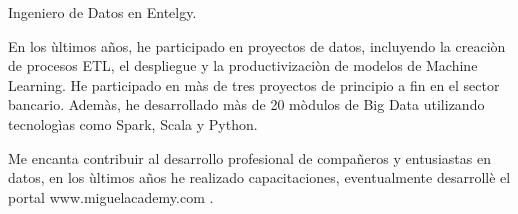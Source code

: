 

\begin{cvparagraph}


Ingeniero de Datos en Entelgy.

En los \`{u}ltimos años, he participado en proyectos de datos, incluyendo la creaci\`{o}n de procesos ETL, el despliegue y la productivizaci\`{o}n de modelos de Machine Learning.
He participado en m\`{a}s de tres proyectos de principio a fin en el sector bancario.
Adem\`{a}s, he desarrollado m\`{a}s de 20 m\`{o}dulos de Big Data utilizando tecnolog\`{i}as como Spark, Scala y Python.


Me encanta contribuir al desarrollo profesional de compañeros y entusiastas en datos,
en los \`{u}ltimos años he realizado capacitaciones, eventualmente desarroll\`{e} el portal www.miguelacademy.com .

\end{cvparagraph}
